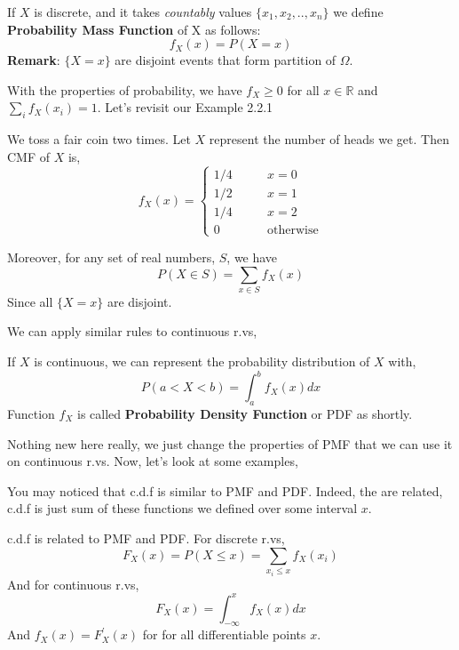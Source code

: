 \begin{definition}
    If $X$ is discrete, and it takes \textit{countably} values $ \{ x_1,x_2,..,x_n \}$ we define \textbf{Probability Mass Function} of X as follows:
    $$f_X(x)= P(X = x)$$
    \textbf{Remark}: $ \{ X=x \} $ are disjoint events that form partition of $\Omega$.
\end{definition}

   With the properties of probability, we have $f_X \ge 0$ for all $x \in \mathbb{R}$ and $\sum_{i} f_X (x_i) =1 $. Let's revisit our Example 2.2.1

   \begin{example}
    We toss a fair coin two times. Let $X$ represent the number of heads we get. Then CMF of $X$ is,
    \[f_X(x) = 
        \begin{cases} 
          1/4 \qquad &x=0\\
          1/2 \qquad &x=1 \\
          1/4 \qquad &x=2\\
          0 \qquad &\text{otherwise}
        \end{cases} 
\]
\end{example}



Moreover, for any set of real numbers, $S$, we have
\[ P (X \in S) = \sum_{x \in S} f_X(x)\]
Since all $\{X = x \}$  are disjoint.\\
\par
We can apply similar rules to continuous r.vs,
\begin{definition}
    If $X$ is continuous, we can represent the probability distribution of $X$ with,
    \[ P(a < X < b) = \int_{a}^{b} f_X(x) dx \]
    Function  $f_X$ is called \textbf{Probability Density Function} or PDF as shortly.
\end{definition}
Nothing new here really, we just change the properties of PMF that we can use it on continuous r.vs. Now, let's look at some examples,\\
\par
You may noticed that c.d.f is similar to PMF and PDF. Indeed, the are related, c.d.f is just sum of these functions we defined over some interval $x$.
\begin{definition}
    c.d.f is related to PMF and PDF. For discrete r.vs,
    \[F_X(x) = P(X \le x) = \sum_{x_i \le x} f_X(x_i)\]
    And for continuous r.vs,
    \[F_X(x)= \int_{-\infty}^x f_X(x)dx \]
    And $f_X(x) = F_X^{'}(x)$ for for all differentiable points $x$.
\end{definition}
\par



